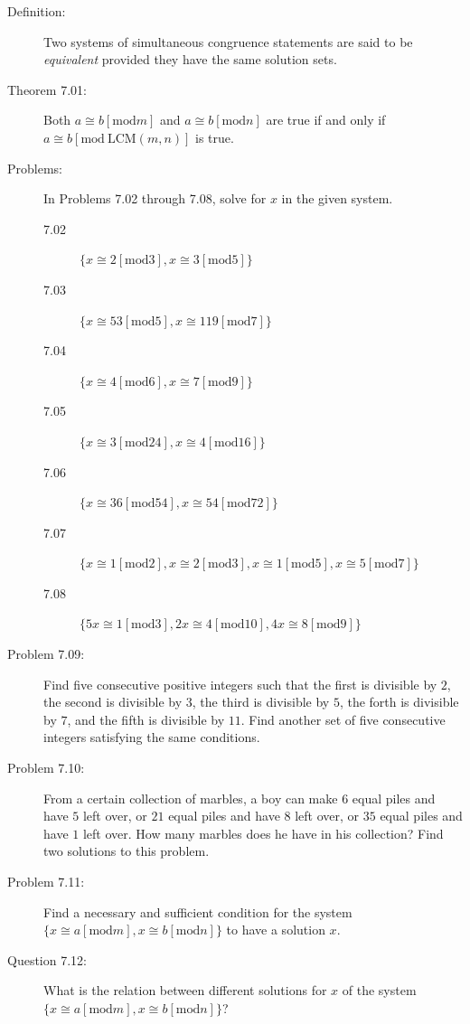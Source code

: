 \documentclass{article}
\begin{document}
\begin{description}

  \item[Definition:] Two systems of simultaneous congruence statements are said to be \emph{equivalent} provided they have the same solution sets.

  \item[Theorem 7.01:] Both $a \cong b [\text{mod} m]$ and $a \cong b [\text{mod} n]$ are true if and only if $a \cong b [\text{mod}\ \text{LCM}(m,n)]$ is true.

  \item[Problems:] In Problems 7.02 through 7.08, solve for $x$ in the given system.
    \begin{description}
      \item[7.02] $\{ x \cong 2 [\text{mod} 3], x \cong 3 [\text{mod} 5] \}$
      \item[7.03] $\{ x \cong 53 [\text{mod} 5], x \cong 119 [\text{mod} 7] \}$
      \item[7.04] $\{ x \cong 4 [\text{mod} 6], x \cong 7 [\text{mod} 9] \}$
      \item[7.05] $\{ x \cong 3 [\text{mod} 24], x \cong 4 [\text{mod} 16] \}$
      \item[7.06] $\{ x \cong 36 [\text{mod} 54], x \cong 54 [\text{mod} 72] \}$
      \item[7.07] $\{ x \cong 1 [\text{mod} 2], x \cong 2 [\text{mod} 3], x \cong 1 [\text{mod} 5], x \cong 5 [\text{mod} 7] \}$
      \item[7.08] $\{ 5x \cong 1 [\text{mod} 3], 2x \cong 4 [\text{mod} 10], 4x \cong 8 [\text{mod} 9] \}$
    \end{description}

  \item[Problem 7.09:] Find five consecutive positive integers such that the first is divisible by $2$, the second is divisible by $3$, the third is divisible by $5$, the forth is divisible by $7$, and the fifth is divisible by $11$. Find another set of five consecutive integers satisfying the same conditions.

  \item[Problem 7.10:] From a certain collection of marbles, a boy can make $6$ equal piles and have $5$ left over, or $21$ equal piles and have $8$ left over, or $35$ equal piles and have $1$ left over. How many marbles does he have in his collection? Find two solutions to this problem.

  \item[Problem 7.11:] Find a necessary and sufficient condition for the system $\{ x \cong a [\text{mod} m], x \cong b [\text{mod} n] \}$ to have a solution $x$.

  \item[Question 7.12:] What is the relation between different solutions for $x$ of the system $\{ x \cong a [\text{mod} m], x \cong b [\text{mod} n] \}$?

\end{description}
\end{document}
